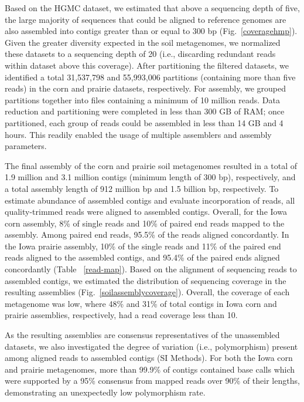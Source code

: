 \documentclass{pnastwo}
\begin{document}
\begin{article}
Based on the HGMC dataset, we estimated that above a sequencing depth of five,
the large majority of sequences that could be aligned to reference genomes are also assembled into contigs greater than or
equal to 300 bp (Fig.~\ref{coveragehmp}). Given the greater diversity expected in
the soil metagenomes, we normalized these datasets to a sequencing depth of 20
(i.e., discarding redundant reads within dataset above this coverage). After
partitioning the filtered datasets, we identified a total 31,537,798 and
55,993,006 partitions (containing more than five reads) in the corn and prairie
datasets, respectively. For assembly, we grouped partitions together into files
containing a minimum of 10 million reads. Data reduction and partitioning were
completed in less than 300 GB of RAM; once partitioned, each group of reads
could be assembled in less than 14 GB and 4 hours. This readily enabled the
usage of multiple assemblers and assembly parameters.

The final assembly of the corn and prairie soil metagenomes resulted in a total
of 1.9 million and 3.1 million contigs (minimum length of 300 bp), respectively,
and a total assembly length of 912 million bp and 1.5 billion bp, respectively.
To estimate abundance of assembled contigs and evaluate incorporation of reads,
all quality-trimmed reads were aligned to assembled contigs. Overall, for the
Iowa corn assembly, 8\% of single reads and 10\% of paired end reads mapped to
the assembly. Among paired end reads, 95.5\% of the reads aligned concordantly.
In the Iowa prairie assembly, 10\% of the single reads and 11\% of the paired
end reads aligned to the assembled contigs, and 95.4\% of the paired ends
aligned concordantly (Table ~\ref{read-map}). Based on the alignment of
sequencing reads to assembled contigs, we estimated the distribution of
sequencing coverage in the resulting assemblies (Fig.~\ref{soilassemblycoverage}).
Overall, the coverage of each metagenome was low, where 48\% and 31\% of total
contigs in Iowa corn and prairie assemblies, respectively, had a read
coverage less than 10.

As the resulting assemblies are consensus representatives of the unassembled
datasets, we also investigated the degree of variation (i.e., polymorphism)
present among aligned reads to assembled contigs (SI Methods). 
For both the Iowa corn and prairie metagenomes, more than 99.9\% of
contigs contained base calls which were supported by a 95\% consensus from
mapped reads over 90\% of their lengths, demonstrating an unexpectedly low
polymorphism rate.
 

\end{article}
\end{document}
